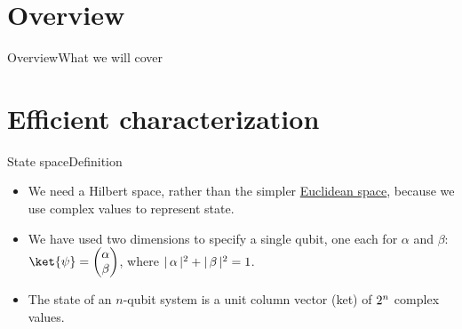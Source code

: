 
\section{Overview}
\begin{frame}{Overview}{What we will cover}
    
\end{frame}

\section{Efficient characterization}

\begin{frame}{State space}{Definition}
\begin{itemize}
    \item We need a Hilbert space, rather than the simpler \href{https://en.wikipedia.org/wiki/Euclidean_space}{Euclidean space}, because we use complex values to represent state.
    \item We have used two dimensions to specify a single qubit, one each for $\alpha$ and $\beta$: $\ket{\psi}=\SQB{\alpha}{\beta}$, where
    $|\,\alpha\,|^{2}+|\,\beta\,|^{2}=1$.
  
    \item The state of an $n$-qubit system is a unit column vector (ket)  of $2^{n}$ complex values.
\end{itemize}
\end{frame}

